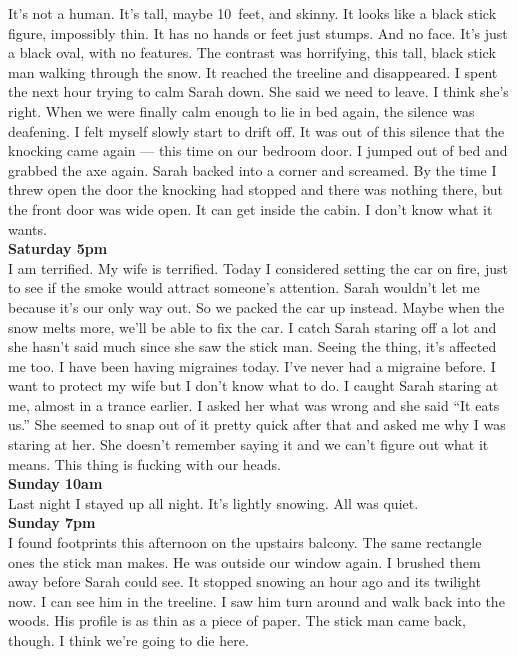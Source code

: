 \documentclass[a5paper]{scrartcl}
\begin{document}
It's not a human. It's tall, maybe 10~feet, and skinny. It looks like a black stick figure, impossibly thin. It has no hands or feet just stumps. And no face. It's just a black oval, with no features. The contrast was horrifying, this tall, black stick man walking through the snow. It reached the treeline and disappeared. I spent the next hour trying to calm Sarah down. She said we need to leave. I think she's right. When we were finally calm enough to lie in bed again, the silence was deafening. I felt myself slowly start to drift off. It was out of this silence that the knocking came again --- this time on our bedroom door. I jumped out of bed and grabbed the axe again. Sarah backed into a corner and screamed. By the time I threw open the door the knocking had stopped and there was nothing there, but the front door was wide open. It can get inside the cabin.  I don't know what it wants. \\


\textbf{Saturday 5pm}
\\


I am terrified. My wife is terrified. Today I considered setting the car on fire, just to see if the smoke would attract someone's attention. Sarah wouldn't let me because it's our only way out. So we packed the car up instead. Maybe when the snow melts more, we'll be able to fix the car. I catch Sarah staring off a lot and she hasn't said much since she saw the stick man. Seeing the thing, it's affected me too. I have been having migraines today. I've never had a migraine before. I want to protect my wife but I don't know what to do. I caught Sarah staring at me, almost in a trance earlier. I asked her what was wrong and she said \enquote{It eats us.} She seemed to snap out of it pretty quick after that and asked me why I was staring at her. She doesn't remember saying it and we can't figure out what it means. This thing is fucking with our heads. \\


\textbf{Sunday 10am}
\\


Last night I stayed up all night. It's lightly snowing. All was quiet.\\


\textbf{Sunday 7pm}
\\


I found footprints this afternoon on the upstairs balcony. The same rectangle ones the stick man makes. He was outside our window again. I brushed them away before Sarah could see. It stopped snowing an hour ago and its twilight now. I can see him in the treeline. I saw him turn around and walk back into the woods. His profile is as thin as a piece of paper. The stick man came back, though. I think we're going to die here.\\
\end{document}
